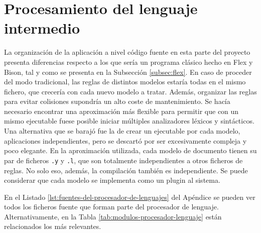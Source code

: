 \section{Procesamiento del lenguaje intermedio}

La organización de la aplicación a nivel código fuente en esta parte del proyecto presenta diferencias respecto a los que sería un programa clásico hecho en Flex y Bison, tal y como se presenta en la Subsección \ref{subsec:flex}. En caso de proceder del modo tradicional, las reglas de distintos modelos estaría todas en el mismo fichero, que crecería con cada nuevo modelo a tratar. Además, organizar las reglas para evitar colisiones supondría un alto coste de mantenimiento. Se hacía necesario encontrar una aproximación más flexible para permitir que con un mismo ejecutable fuese posible iniciar múltiples analizadores léxicos y sintácticos. Una alternativa que se barajó fue la de crear un ejecutable por cada modelo, aplicaciones independientes, pero se descartó por ser excesivamente compleja y poco elegante. En la aproximación utilizada, cada modelo de documento tienen su par de ficheros \verb|.y| y \verb|.l|, que son totalmente independientes a otros ficheros de reglas. No solo eso, además, la compilación también es independiente. Se puede considerar que cada modelo se implementa como un plugin al sistema.

En el Listado \ref{lst:fuentes-del-procesador-de-lenguajes} del Apéndice se pueden ver todos los ficheros fuente que forman parte del procesador de lenguaje. Alternativamente, en la Tabla \ref{tab:modulos-procesador-lenguaje} están relacionados los más relevantes.

